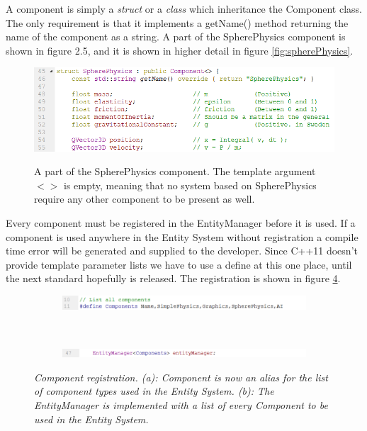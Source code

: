 A component is simply a \textit{struct} or a \textit{class} which inheritance the Component class. The only requirement is that it implements a getName() method returning the name of the component as a string. A part of the SpherePhysics component is shown in figure 2.5, and it is shown in higher detail in figure \ref{fig:spherePhysics}.
\begin{figure}[H]
  \centering
  \includegraphics[width=0.9\linewidth]{images/SpherePhysicsPartExample.png}
  \label{fig:spherePhysicsPart}
  \caption{A part of the SpherePhysics component. The template argument \textit{$<>$} is empty, meaning that no system based on SpherePhysics require any other component to be present as well.}
\end{figure}
Every component must be registered in the EntityManager before it is used. If a component is used anywhere in the Entity System without registration a compile time error will be generated and supplied to the developer. Since C++11 doesn't provide template parameter lists we have to use a define at this one place, until the next standard hopefully is released. The registration is shown in figure \ref{fig:entityInitializationExample}.
\begin{figure}[H]
\begin{subfigure}{\textwidth}
  \centering
  \includegraphics[width=0.9\linewidth]{images/componentList.png}
  \caption{}
  \label{fig:componentListExample}
\end{subfigure}%
\\
\begin{subfigure}{\textwidth}
  \centering
  \includegraphics[width=0.9\linewidth]{images/entityManagerInstanciation.png}
  \caption{}
  \label{fig:entityManagerInstanciation}
\end{subfigure}
\caption[Ground textures]{\textit{Component registration. (a): Component is now an alias for the list of component types used in the Entity System. (b): The EntityManager is implemented with a list of every Component to be used in the Entity System.}}
\label{fig:entityInitializationExample}
\end{figure}
